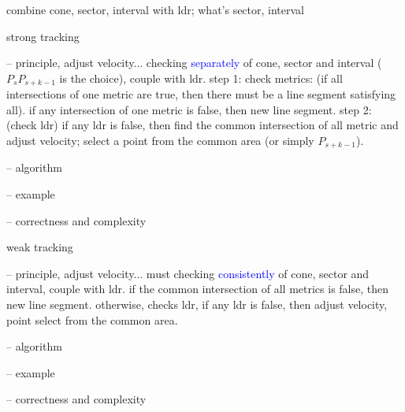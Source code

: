 combine cone, sector, interval with ldr; what's sector, interval


strong tracking

-- principle, adjust velocity...
	checking \textcolor{blue}{separately} of cone, sector and interval ($P_sP_{s+k-1}$ is the choice), couple with ldr.
	step 1: check metrics: (if all intersections of one metric are true, then there must be a line segment satisfying all).
	if any intersection of one metric is false, then new line segment.
	step 2:	(check ldr) if any ldr is false, then find the common intersection of all metric and adjust velocity; select a point from the common area (or simply $P_{s+k-1}$).

-- algorithm

-- example

-- correctness and complexity

weak tracking

-- principle, adjust velocity...
	must checking \textcolor{blue}{consistently} of cone, sector and interval, couple with ldr.
	if the common intersection of all metrics is false, then new line segment.
	otherwise, checks ldr, 	if any ldr is false, then adjust velocity, point select from the common area.
	
-- algorithm

-- example

-- correctness and complexity

